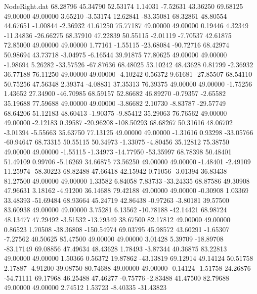 \begin{filecontents}{NodeRight.dat}
  68.28796   45.34790   52.53174     1.14031   -7.52631   43.36250   69.68125   49.00000   49.00000    3.65210   -3.53174   12.62841  -83.35081
  68.32861   48.80554   44.67651    -1.00844   -2.36932   41.61250   75.77187   49.00000   49.00000    0.19446    4.32349  -11.34836  -26.66275
  68.37910   47.22839   50.55115    -2.01119   -7.70537   42.61875   72.85000   49.00000   49.00000    1.77161   -1.55115  -23.68084  -90.72716
  68.42974   50.98694   43.73718    -3.04975   -6.16544   39.91875   77.80625   49.00000   49.00000   -1.98694    5.26282  -33.57526  -67.87636
  68.48025   53.10242   48.43628     0.81799   -2.36932   36.77188   76.11250   49.00000   49.00000   -4.10242    0.56372    9.61681  -27.85507
  68.54110   50.75256   47.56348     2.39374   -4.08831   37.35313   76.39375   49.00000   49.00000   -1.75256    1.43652   27.34900  -46.70985
  68.59157   52.86682   46.89270    -0.79357   -2.65582   35.19688   77.59688   49.00000   49.00000   -3.86682    2.10730   -8.83787  -29.57749
  68.64206   51.12183   48.60413    -1.90375   -9.85412   35.29063   76.76562   49.00000   49.00000   -2.12183    0.39587  -20.96208 -108.50293
  68.68267   50.31616   48.06702    -3.01394   -5.55663   35.63750   77.13125   49.00000   49.00000   -1.31616    0.93298  -33.05766  -60.94647
  68.73315   50.55115   50.34973    -1.33075   -4.80456   35.12812   75.38750   49.00000   49.00000   -1.55115   -1.34973  -14.77950  -53.35997
  68.78398   50.48401   51.49109     0.99706   -5.16269   34.66875   73.56250   49.00000   49.00000   -1.48401   -2.49109   11.25974  -58.30223
  68.82488   47.66418   42.15942     0.71056   -3.01394   36.83438   81.27500   49.00000   49.00000    1.33582    6.84058    7.83733  -33.24335
  68.87586   49.30908   47.96631     3.18162   -4.91200   36.14688   79.42188   49.00000   49.00000   -0.30908    1.03369   33.48393  -51.69484
  68.93664   45.24719   42.86438    -0.97263   -3.80181   39.57500   83.60938   49.00000   49.00000    3.75281    6.13562  -10.78188  -42.14421
  68.98724   48.13477   47.29492    -3.51532  -13.79349   38.67500   82.17812   49.00000   49.00000    0.86523    1.70508  -38.36808 -150.54974
  69.03795   45.98572   43.60291    -1.65307   -7.27562   40.50625   85.47500   49.00000   49.00000    3.01428    5.39709  -18.89708  -83.17149
  69.08856   47.49634   48.43628     1.78493   -3.87344   40.36875   83.22813   49.00000   49.00000    1.50366    0.56372   19.87862  -43.13819
  69.12914   49.14124   50.51758     2.17887   -4.91200   39.08750   80.74688   49.00000   49.00000   -0.14124   -1.51758   24.26876  -54.71111
  69.17968   46.25488   47.46277    -0.75776   -2.83488   41.47500   82.79688   49.00000   49.00000    2.74512    1.53723   -8.40335  -31.43823

\end{filecontents}
